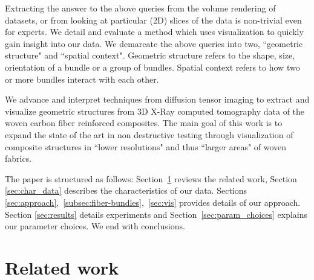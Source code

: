 Extracting the answer to the above queries from the volume rendering of datasets, or from looking at  particular (2D) slices of the data is non-trivial even for experts. We detail and evaluate a method which uses visualization to quickly gain insight into our data. We demarcate the above queries into two, ``geometric structure" and ``spatial context". Geometric structure refers to the shape, size, orientation of a bundle or a group of bundles. Spatial context refers to how two or more bundles interact with each other. 

We advance and interpret techniques from diffusion tensor imaging to extract and visualize geometric structures from 3D X-Ray computed tomography data of the woven carbon fiber reinforced composites.
The main goal of this work is to expand the state of the art in non destructive testing through visualization of composite structures in ``lower resolutions" and thus ``larger areas" of woven fabrics.

The paper is structured as follows: Section~\ref{sec:prev_work} reviews the related work,  Section \ref{sec:char_data} describes the   characteristics of our data. Sections \ref{sec:approach},~\ref{subsec:fiber-bundles},~\ref{sec:vis} provides details of our approach. Section \ref{sec:results} details experiments and Section~\ref{sec:param_choices} explains our  parameter choices. We end with conclusions.

\section {Related work}
\label{sec:prev_work}

